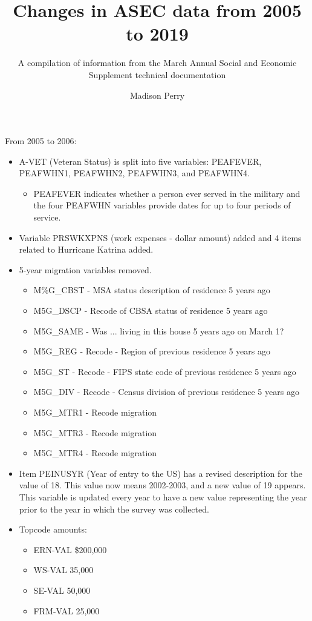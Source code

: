 \documentclass{article}
\author{Madison Perry}
\title{Changes in ASEC data from 2005 to 2019}
\subtitle{A compilation of information from the March Annual Social and Economic Supplement technical documentation}
\begin{document}
	
	\maketitle

From 2005 to 2006:
\begin{itemize}
	 \item{ A-VET (Veteran Status) is split into five variables: PEAFEVER, PEAFWHN1, PEAFWHN2, PEAFWHN3, and PEAFWHN4.}
	 \begin{itemize}
	 	\item{PEAFEVER indicates whether a person ever served in the military and the four PEAFWHN variables provide dates for up to four periods of service.}
	 \end{itemize}
	\item{Variable PRSWKXPNS (work expenses - dollar amount) added and 4 items related to Hurricane Katrina added.}
	\item{5-year migration variables removed.}
	\begin{itemize}
		\item{M\%G\_CBST - MSA status description of residence 5 years ago}
		\item{M5G\_DSCP - Recode of CBSA status of residence 5 years ago}
		\item{M5G\_SAME - Was ... living in this house 5 years ago on March 1?}
		\item{M5G\_REG -  Recode - Region of previous residence 5 years ago}
		\item{M5G\_ST - Recode - FIPS state code of previous residence 5 years ago}
		\item{M5G\_DIV - Recode - Census division of previous residence 5 years ago}
		\item{M5G\_MTR1 - Recode migration}
		\item{M5G\_MTR3 - Recode migration}
		\item{M5G\_MTR4 - Recode migration}
	\end{itemize}
	\item{Item PEINUSYR (Year of entry to the US) has a revised description for the value of 18. This value now means 2002-2003, and a new value of 19 appears. This variable is updated every year to have a new value representing the year prior to the year in which the survey was collected.}
	\item Topcode amounts:
	\begin{itemize}
		\item ERN-VAL \$200,000
		\item WS-VAL 35,000
		\item SE-VAL 50,000
		\item FRM-VAL 25,000
	\end{itemize}
\end{itemize}
	
\end{document}
